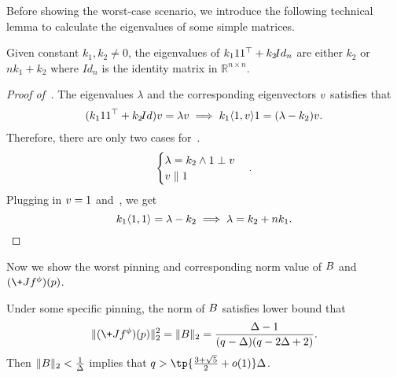 Before showing the worst-case scenario, we introduce the following technical lemma to calculate the eigenvalues of some simple matrices.
\begin{lemma}\label{lem:calc_eigenvalues}
    Given constant $k_1,k_2\neq 0$, 
    the eigenvalues of $k_1\*1\*1^\top +k_2 \!{Id}_n$ are either $k_2$ or $nk_1 + k_2$ where $\!{Id}_n$ is the identity matrix in $\mathbb{R}^{n\times n}$.
\end{lemma}
\begin{proof}[Proof of~]
    The eigenvalues $\lambda$ and the corresponding eigenvectors $\*v$ satisfies that 
    \begin{align}\label{eq:eigen_equation}
        (k_1 \*1\*1^\top + k_2\!{Id})\*v = \lambda \*v
        \implies k_1\langle\*1,\*v\rangle \*1 = (\lambda - k_2)\*v.
    \end{align}
    Therefore, there are only two cases for~.
    $$
    \begin{cases}
        \lambda = k_2 \land \*1\perp \*v
        \\\*v \parallel \*1
    \end{cases}.
    $$
    Plugging in $\*v = \*1$ and~, we get
    $$
        k_1\langle\*1,\*1\rangle = \lambda - k_2 \implies \lambda = k_2 + nk_1.
    $$
\end{proof}
Now we show the worst pinning and corresponding norm value of $\*B$ and $(\+J f^\phi)(\*p)$.
\begin{theorem}\label{thm:worst_pinning}
    Under some specific pinning, the norm of $\*B$ satisfies lower bound that
    $$
    \|(\+J f^\phi)(\*p)\|_2^2 = \|\*B\|_2 = \frac{\Delta-1}{(q-\Delta)(q-2\Delta+2)}.
    $$
    Then $\|\*B\|_2 < \frac 1\Delta$ implies that $q > \tp{\frac{3+\sqrt 5}{2}+o(1)}\Delta$.
\end{theorem}
